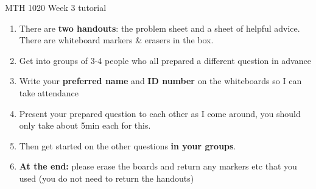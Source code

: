 \documentclass{beamer}
\begin{document}
\begin{frame}{MTH 1020 Week 3 tutorial}
\begin{enumerate}
  \item There are \textbf{two handouts}: the problem sheet and a sheet of helpful advice. There are whiteboard markers \& erasers in the box.
  \item Get into groups of 3-4 people who all prepared a different question in advance
  \item Write your \textbf{preferred name} and \textbf{ID number} on the whiteboards so I can take attendance
  \item Present your prepared question to each other as I come around, you should only take about 5min each for this.
  \item Then get started on the other questions \textbf{in your groups}.
  \item \textbf{At the end:} please erase the boards and return any markers etc that you used (you do not need to return the handouts)
\end{enumerate}
\end{frame}
\end{document}
